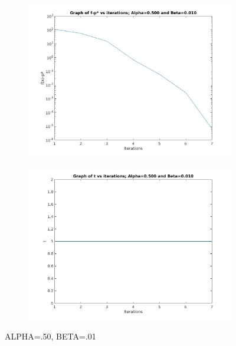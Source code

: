 \documentclass[12pt]{article}
\begin{document}
\begin{figure}[ht]
    \centering
    \begin{subfigure}{0.4\textwidth} %
        \includegraphics[width=\textwidth]{newton_f_alpha_50_beta_01.jpg}
    \end{subfigure}
    \vspace{1em} %
    \begin{subfigure}{0.4\textwidth} %
        \includegraphics[width=\textwidth]{newton_t_alpha_50_beta_01.jpg}
    \end{subfigure}
    \caption{ALPHA=.50, BETA=.01} %
\end{figure}
\end{document}
